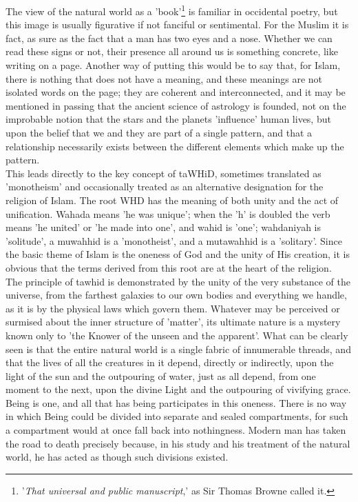 \documentclass[11pt, b5paper, twoside]{book}
\begin{document}
The view of the natural world as a 'book'\footnote{'\emph{That universal and public manuscript},' as Sir Thomas Browne called it.} is familiar in occidental poetry, but this image is usually figurative if not fanciful or sentimental. For the Muslim it is fact, as sure as the fact that a man has two eyes and a nose. Whether we can read these signs or not, their presence all around us is something concrete, like writing on a page. Another way of putting this would be to say that, for Islam, there is nothing that does not have a meaning, and these meanings are not isolated words on the page; they are coherent and interconnected, and it may be mentioned in passing that the ancient science of astrology is founded, not on the improbable notion that the stars and the planets 'influence' human lives, but upon the belief that we and they are part of a single pattern, and that a relationship necessarily exists between the different elements which make up the pattern. \\

This leads directly to the key concept of taWHiD, sometimes translated as 'monotheism' and 
occasionally treated as an alternative designation for the religion of Islam. The root WHD has the 
meaning of both unity and the act of unification. Wahada means 'he was unique'; when the 'h' is 
doubled the verb means 'he united' or 'he made into one', and wahid is 'one'; wahdaniyah is 
'solitude', a muwahhid is a 'monotheist', and a mutawahhid is a 'solitary'. Since the basic theme of 
Islam is the oneness of God and the unity of His creation, it is obvious that the terms derived from 
this root are at the heart of the religion. \\

The principle of tawhid is demonstrated by the unity of the very substance of the universe, from the 
farthest galaxies to our own bodies and everything we handle, as it is by the physical laws which 
govern them. Whatever may be perceived or surmised about the inner structure of 'matter', its 
ultimate nature is a mystery known only to 'the Knower of the unseen and the apparent'. What can be 
clearly seen is that the entire natural world is a single fabric of innumerable threads, and that the 
lives of all the creatures in it depend, directly or indirectly, upon the light of the sun and the 
outpouring of water, just as all depend, from one moment to the next, upon the divine Light and the 
outpouring of vivifying grace. Being is one, and all that has being participates in this oneness. 
There is no way in which Being could be divided into separate and sealed compartments, for such a 
compartment would at once fall back into nothingness. Modern man has taken the road to death 
precisely because, in his study and his treatment of the natural world, he has acted as though such 
divisions existed. \\
\end{document}
